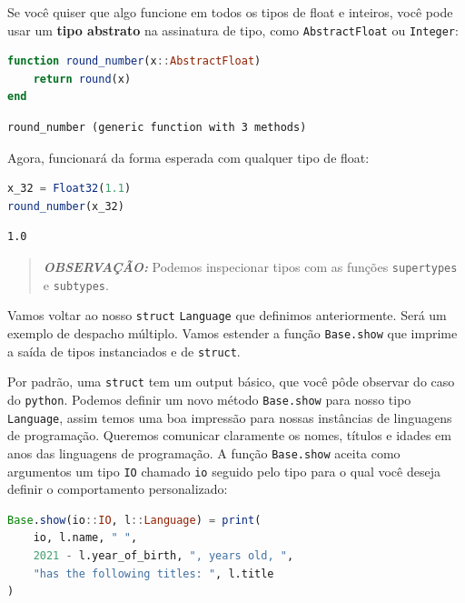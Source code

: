 \documentclass[
  notoc %
]{tufte-book}
\newcommand{\passthrough}[1]{#1}
\begin{document}
Se você quiser que algo funcione em todos os tipos de float e inteiros,
você pode usar um \textbf{tipo abstrato} na assinatura de tipo, como
\passthrough{\lstinline!AbstractFloat!} ou
\passthrough{\lstinline!Integer!}:

\begin{lstlisting}[language=Julia]
function round_number(x::AbstractFloat)
    return round(x)
end
\end{lstlisting}

\begin{lstlisting}[language=Output]
round_number (generic function with 3 methods)
\end{lstlisting}

Agora, funcionará da forma esperada com qualquer tipo de float:

\begin{lstlisting}[language=Julia]
x_32 = Float32(1.1)
round_number(x_32)
\end{lstlisting}

\begin{lstlisting}[language=Output]
1.0
\end{lstlisting}

\begin{quote}
\textbf{\emph{OBSERVAÇÃO:}} Podemos inspecionar tipos com as funções
\passthrough{\lstinline!supertypes!} e
\passthrough{\lstinline!subtypes!}.
\end{quote}

Vamos voltar ao nosso \passthrough{\lstinline!struct!}
\passthrough{\lstinline!Language!} que definimos anteriormente. Será um
exemplo de despacho múltiplo. Vamos estender a função
\passthrough{\lstinline!Base.show!} que imprime a saída de tipos
instanciados e de \passthrough{\lstinline!struct!}.

Por padrão, uma \passthrough{\lstinline!struct!} tem um output básico,
que você pôde observar do caso do \passthrough{\lstinline!python!}.
Podemos definir um novo método \passthrough{\lstinline!Base.show!} para
nosso tipo \passthrough{\lstinline!Language!}, assim temos uma boa
impressão para nossas instâncias de linguagens de programação. Queremos
comunicar claramente os nomes, títulos e idades em anos das linguagens
de programação. A função \passthrough{\lstinline!Base.show!} aceita como
argumentos um tipo \passthrough{\lstinline!IO!} chamado
\passthrough{\lstinline!io!} seguido pelo tipo para o qual você deseja
definir o comportamento personalizado:

\begin{lstlisting}[language=Julia]
Base.show(io::IO, l::Language) = print(
    io, l.name, " ",
    2021 - l.year_of_birth, ", years old, ",
    "has the following titles: ", l.title
)
\end{lstlisting}
\end{document}
